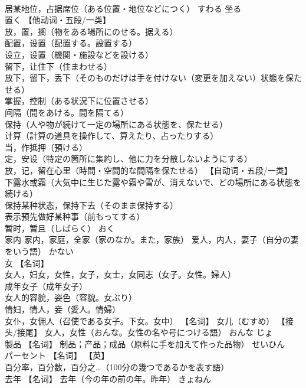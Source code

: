 \documentclass[8pt]{extreport}
\begin{document}
\begin{CJK}{UTF8}{min}
\\	居某地位，占据席位（ある位置・地位などにつく）	すわる	坐る
\\	置く	【他动词・五段/一类】 
\\	放，置，搁（物をある場所にのせる。据える） 
\\	配置，设置（配置する。設置する） 
\\	设立，设置（機関・施設などを設ける） 
\\	留下，让住下（住まわせる） 
\\	放下，留下，丢下（そのものだけは手を付けない（変更を加えない）状態を保たせる） 
\\	掌握，控制（ある状況下に位置させる） 
\\	间隔（間をあける。間を隔てる） 
\\	保持（人や物が続けて一定の場所にある状態を、保たせる） 
\\	计算（計算の道具を操作して、算えたり、占ったりする） 
\\	当，作抵押（預ける） 
\\	定，安设（特定の箇所に集約し、他に力を分散しないようにする） 
\\	放，记，留在心里（時間・空間的な間隔を保たせる） 【自动词・五段/一类】 
\\	下露水或霜（大気中に生じた露や霜や雪が、消えないで、どの場所にある状態を続ける） 
\\	保持某种状态，保持下去（そのまま保持する） 
\\	表示预先做好某种事（前もってする） 
\\	暂时，暂且（しばらく）	おく	
\\	家内	家内，家庭，全家（家のなか。また，家族） 爱人，内人，妻子（自分の妻をいう語）	かない	
\\	女	【名词】 
\\	女人，妇女，女性，女子，女士，女同志（女子。女性。婦人） 
\\	成年女子（成年女子） 
\\	女人的容貌，姿色（容貌。女ぶり） 
\\	情妇，情人，妾（愛人。情婦） 
\\	女仆，女佣人（召使である女子。下女。女中） 【名词】 女儿（むすめ） 【接头/接尾】 女人，女性（おんな。女性の名や号につける語）	おんな じょ	
\\	製品	【名词】 制品；产品；成品（原料に手を加えて作った品物）	せいひん	
\\	パーセント	【名词】 【英】
\\	百分率，百分数，百分之…（100分の幾つであるかを表す語）		
\\	去年	【名词】 去年（今の年の前の年。昨年）	きょねん	

\end{CJK}
\end{document}
